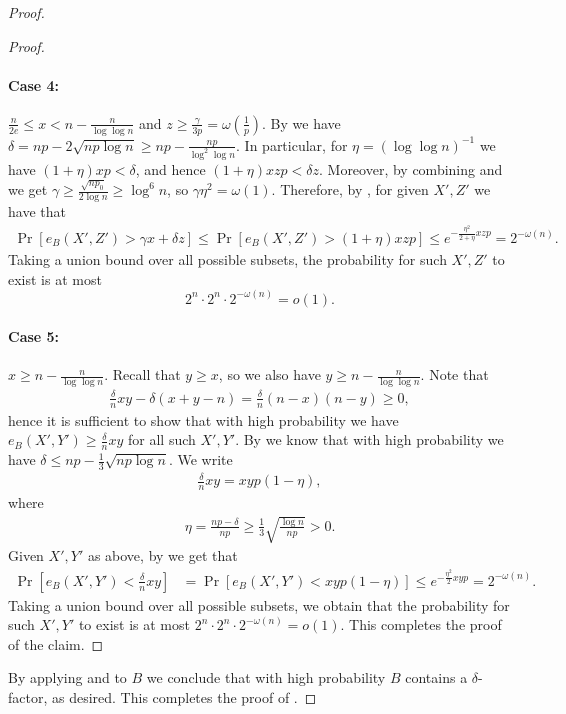 \documentclass{article}
\begin{document}
\begin{proof}
\begin{proof}
			\paragraph*{Case 4:}
			$\frac{n}{2e} \le x < n-\frac{n}{\log \log n}$ and $z\geq \frac{\gamma}{3p}= \omega\left(\frac{1}{p} \right)$.
			By  we have $\delta= np - 2\sqrt{np\log n} \ge np-\frac{np}{\log^2\log n}$.
			In particular, for $\eta=(\log\log n)^{-1}$ we have $(1+\eta)xp < \delta$, and hence $(1+\eta)xzp < \delta z$.
			Moreover, by combining  and  we get $\gamma \ge \frac{\sqrt{np_0}}{2\log n} \ge \log^6 n$, so $\gamma \eta^2=\omega(1)$.
			Therefore, by , for given $X', Z'$ we have that
			\begin{align*}
			\Pr\left[e_B(X',Z') > \gamma x + \delta z \right] \le \Pr\left[e_B(X',Z') > (1+\eta)xzp \right] \le e^{-\frac{\eta^2}{2+\eta}xzp}=2^{-\omega(n)}.
			\end{align*}
			Taking a union bound over all possible subsets, the probability for such $X',Z'$ to exist is at most
			$$2^n\cdot  2^n\cdot 2^{-\omega(n)}=o(1).$$
			
			\paragraph*{Case 5:}
			$x\geq n-\frac{n}{\log\log n}$.
			Recall that $y\ge x$, so we also have $y \ge n - \frac{n}{\log\log n}$.
			Note that
			\begin{align*}
			\frac{\delta}{n}xy - \delta(x+y-n) = \frac{\delta}{n}(n-x)(n-y) \ge 0,
			\end{align*}
			hence it is sufficient to show that with high probability we have $e_B(X',Y') \ge \frac{\delta}{n}xy$ for all such $X', Y'$.
			By  we know that with high probability we have $\delta \le np - \frac{1}{3}\sqrt{np\log n}$.
			We write
			\begin{align*}
			\frac{\delta}{n}xy = xyp(1-\eta),
			\end{align*}
			where
			\begin{align*}
			\eta = \frac{np - \delta}{np} \ge \frac{1}{3}\sqrt{\frac{\log n}{np}} > 0.
			\end{align*}
			Given $X',Y'$ as above, by  we get that
			\begin{align*}
			\Pr\left[e_B(X',Y') < \frac{\delta}{n}xy \right] &= \Pr\left[e_B(X',Y') < xyp(1-\eta) \right] \le e^{-\frac{\eta^2}{2}xyp}=2^{-\omega(n)}.
			\end{align*}
			Taking a union bound over all possible subsets, we obtain that the probability for such $X',Y'$ to exist is at most $2^n\cdot 2^n\cdot 2^{-\omega(n)}=o(1)$. This completes the proof of the claim.
		\end{proof}
		
		By applying  and  to $B$ we conclude that with high probability $B$ contains a $\delta$-factor, as desired. This completes the proof of .
	\end{proof}
	
\end{document}
